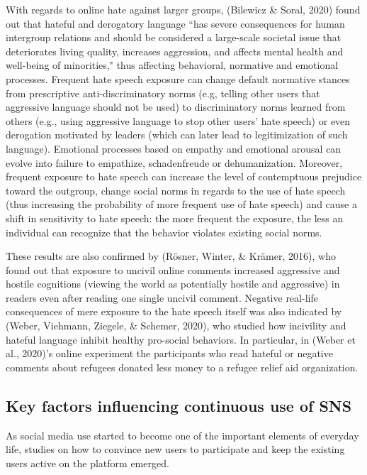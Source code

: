 \documentclass[10pt,dvipsnames]{scrartcl}
\begin{document}
With regards to online hate against larger groups, (Bilewicz \& Soral,
2020) found out that hateful and derogatory language ``has severe
consequences for human intergroup relations and should be considered a
large-scale societal issue that deteriorates living quality, increases
aggression, and affects mental health and well-being of minorities,"
thus affecting behavioral, normative and emotional processes. Frequent
hate speech exposure can change default normative stances from
prescriptive anti-discriminatory norms (e.g, telling other users that
aggressive language should not be used) to discriminatory norms learned
from others (e.g., using aggressive language to stop other users' hate
speech) or even derogation motivated by leaders (which can later lead to
legitimization of such language). Emotional processes based on empathy
and emotional arousal can evolve into failure to empathize,
schadenfreude or dehumanization. Moreover, frequent exposure to hate
speech can increase the level of contemptuous prejudice toward the
outgroup, change social norms in regards to the use of hate speech (thus
increasing the probability of more frequent use of hate speech) and
cause a shift in sensitivity to hate speech: the more frequent the
exposure, the less an individual can recognize that the behavior
violates existing social norms.

These results are also confirmed by (Rösner, Winter, \& Krämer, 2016),
who found out that exposure to uncivil online comments increased
aggressive and hostile cognitions (viewing the world as potentially
hostile and aggressive) in readers even after reading one single uncivil
comment. Negative real-life consequences of mere exposure to the hate
speech itself was also indicated by (Weber, Viehmann, Ziegele, \&
Schemer, 2020), who studied how incivility and hateful language inhibit
healthy pro-social behaviors. In particular, in (Weber et al., 2020)'s
online experiment the participants who read hateful or negative comments
about refugees donated less money to a refugee relief aid organization.

\subsection{Key factors  influencing continuous use of SNS}

As social media use started to become one of the important elements of
everyday life, studies on how to convince new users to participate and
keep the existing users active on the platform emerged.
\end{document}
